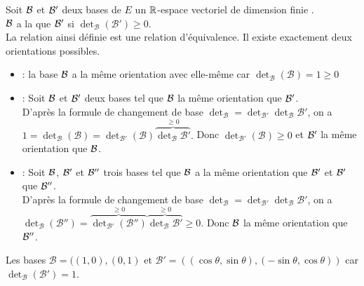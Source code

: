 \documentclass{book}
\begin{document}
\begin{DefinitionProposition}
Soit $\cal B$ et $\cal B'$ deux bases de $E$ un $\mathbb{R}$-espace vectoriel de dimension finie .\\ 
$\cal B$ a la  que $\cal B'$ si $\det_{\mathcal{B}} ({\mathcal{B}}') \geq 0$.\\
La relation ainsi définie est une relation d'équivalence. Il existe exactement deux orientations possibles.
\end{DefinitionProposition}
\begin{Demonstration}
\begin{itemize}
\item {} : la base $\cal B$  a la même orientation avec elle-même  car $\det_{\mathcal{B}} ({\mathcal{B}})=1 \geq 0$
\item {} : Soit $\cal B$ et $\cal B'$ deux bases tel que  $\cal B$ la même orientation que $\cal B'$.\\
D'après la formule de changement de base  $\det_{\mathcal{B}} =\det_{\mathcal{B}'}\det_{\mathcal{B}}{\mathcal{B}'}$, on a $1=\det_{\mathcal{B}}(\mathcal{B}) =\det_{\mathcal{B}'} (\mathcal{B})\overbrace{\det_{\mathcal{B}}{\mathcal{B}'}}^{\geq 0}.$ Donc $\det_{\mathcal{B}'} (\mathcal{B})\geq 0$ et $\cal B'$ la même orientation que $\cal B$.
\item {} : Soit $\cal B$, $\cal B'$ et $\cal B''$ trois bases tel que $\cal B$ a la même orientation que $\cal B'$  et $\cal B'$ que $\cal B''$.\\
D'après la formule de changement de base  $\det_{\mathcal{B}} =\det_{\mathcal{B}'}\det_{\mathcal{B}}{\mathcal{B}'}$, on a $\det_{\mathcal{B}}(\mathcal{B}'') =\overbrace{\det_{\mathcal{B}'} (\mathcal{B}'')}^{\geq 0}\overbrace{\det_{\mathcal{B}}{\mathcal{B}'}}^{\geq 0}\geq 0.$ Donc  $\cal B$ la même orientation que $\cal B''$.
\end{itemize}
\end{Demonstration}
\begin{Exemple}
Les bases $\mathcal{B}=((1,0),(0,1)$ et $\mathcal{B'}=((\cos \theta,\sin \theta),(-\sin \theta,\cos \theta))$ car $\det_{\mathcal{B}} (\mathcal{B}')=1$.

\begin{center}
\end{center}
\end{Exemple}
\end{document}
